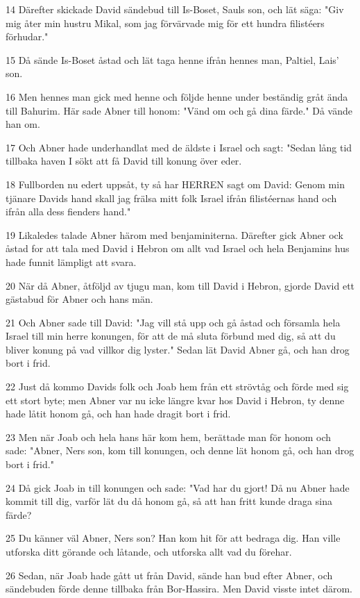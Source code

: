 \par 14 Därefter skickade David sändebud till Is-Boset, Sauls son, och lät säga: "Giv mig åter min hustru Mikal, som jag förvärvade mig för ett hundra filistéers förhudar."
\par 15 Då sände Is-Boset åstad och lät taga henne ifrån hennes man, Paltiel, Lais' son.
\par 16 Men hennes man gick med henne och följde henne under beständig gråt ända till Bahurim. Här sade Abner till honom: "Vänd om och gå dina färde." Då vände han om.
\par 17 Och Abner hade underhandlat med de äldste i Israel och sagt: "Sedan lång tid tillbaka haven I sökt att få David till konung över eder.
\par 18 Fullborden nu edert uppsåt, ty så har HERREN sagt om David: Genom min tjänare Davids hand skall jag frälsa mitt folk Israel ifrån filistéernas hand och ifrån alla dess fienders hand."
\par 19 Likaledes talade Abner härom med benjaminiterna. Därefter gick Abner ock åstad for att tala med David i Hebron om allt vad Israel och hela Benjamins hus hade funnit lämpligt att svara.
\par 20 När då Abner, åtföljd av tjugu man, kom till David i Hebron, gjorde David ett gästabud för Abner och hans män.
\par 21 Och Abner sade till David: "Jag vill stå upp och gå åstad och församla hela Israel till min herre konungen, för att de må sluta förbund med dig, så att du bliver konung på vad villkor dig lyster." Sedan lät David Abner gå, och han drog bort i frid.
\par 22 Just då kommo Davids folk och Joab hem från ett strövtåg och förde med sig ett stort byte; men Abner var nu icke längre kvar hos David i Hebron, ty denne hade låtit honom gå, och han hade dragit bort i frid.
\par 23 Men när Joab och hela hans här kom hem, berättade man för honom och sade: "Abner, Ners son, kom till konungen, och denne lät honom gå, och han drog bort i frid."
\par 24 Då gick Joab in till konungen och sade: "Vad har du gjort! Då nu Abner hade kommit till dig, varför lät du då honom gå, så att han fritt kunde draga sina färde?
\par 25 Du känner väl Abner, Ners son? Han kom hit för att bedraga dig. Han ville utforska ditt görande och låtande, och utforska allt vad du förehar.
\par 26 Sedan, när Joab hade gått ut från David, sände han bud efter Abner, och sändebuden förde denne tillbaka från Bor-Hassira. Men David visste intet därom.
